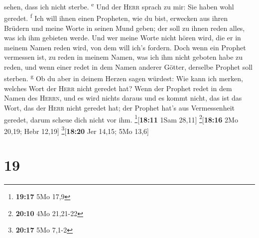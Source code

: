 sehen, dass ich nicht sterbe. \textsuperscript{e}  Und
der \textsc{Herr} sprach zu mir: Sie haben wohl geredet.
\textsuperscript{f}  Ich will ihnen einen Propheten, wie
du bist, erwecken aus ihren Brüdern und meine Worte in seinen Mund
geben; der soll zu ihnen reden alles, was ich ihm gebieten werde.
 Und wer meine Worte nicht hören wird, die er in meinem
Namen reden wird, von dem will ich's fordern.  Doch wenn
ein Prophet vermessen ist, zu reden in meinem Namen, was ich ihm nicht
geboten habe zu reden, und wenn einer redet in dem Namen anderer Götter,
derselbe Prophet soll sterben. \textsuperscript{g}  Ob du
aber in deinem Herzen sagen würdest: Wie kann ich merken, welches Wort
der \textsc{Herr} nicht geredet hat?  Wenn der Prophet
redet in dem Namen des \textsc{Herrn}, und es wird nichts daraus und es
kommt nicht, das ist das Wort, das der \textsc{Herr} nicht geredet hat;
der Prophet hat's aus Vermessenheit geredet, darum scheue dich nicht vor
ihm. \footnote{\textbf{19:17} 5Mo 17,9}{[}\textbf{18:11} 1Sam 28,11{]}
\footnote{\textbf{20:10} 4Mo 21,21-22}{[}\textbf{18:16} 2Mo 20,19; Hebr
12,19{]} \footnote{\textbf{20:17} 5Mo 7,1-2}{[}\textbf{18:20} Jer 14,15;
5Mo 13,6{]}

\hypertarget{section-18}{%
\section{19}\label{section-18}}

